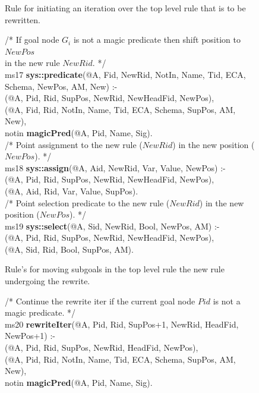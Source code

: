 \begin{appendix}
\begin{figure}[!t]
\begin{boxedminipage}{\linewidth}
\end{boxedminipage}
\caption{\label{ch:evita:fig:mpgoal} Rule for initiating an iteration over the
top level rule that is to be rewritten. }
\end{figure}


\begin{figure}[!t]
\ssp
\centering
\begin{boxedminipage}{\linewidth}
/* If goal node $G_i$ is not a magic predicate then shift position to $NewPos$  \\
   in the new rule $NewRid$. */ \\
ms17 {\bf sys::predicate}(@A, Fid, NewRid, NotIn, Name, Tid, ECA, Schema, NewPos, AM, New) :- \\
(@A, Pid, Rid, SupPos, NewRid, NewHeadFid, NewPos), \\
(@A, Fid, Rid, NotIn, Name, Tid, ECA, Schema, SupPos, AM, New), \\
\datalogspace notin {\bf magicPred}(@A, Pid, Name, Sig). \\
	
/* Point assignment to the new rule ($NewRid$) in the new position ($NewPos$). */ \\
ms18 {\bf sys::assign}(@A, Aid, NewRid, Var, Value, NewPos) :- \\
(@A, Pid, Rid, SupPos, NewRid, NewHeadFid, NewPos), \\
(@A, Aid, Rid, Var, Value, SupPos). \\
	
/* Point selection predicate to the new rule ($NewRid$) in the new position ($NewPos$). */ \\
ms19 {\bf sys::select}(@A, Sid, NewRid, Bool, NewPos, AM) :- \\
(@A, Pid, Rid, SupPos, NewRid, NewHeadFid, NewPos), \\
(@A, Sid, Rid, Bool, SupPos, AM).

\end{boxedminipage}
\caption{\label{ch:evita:fig:mpgoal} Rule's for moving subgoals in the top level rule
the new rule undergoing the rewrite. }
\end{figure}

\begin{figure}[!t]
\ssp
\centering
\begin{boxedminipage}{\linewidth}
/* Continue the rewrite iter if the current goal node $Pid$ is not a magic predicate. */ \\
ms20 {\bf rewriteIter}(@A, Pid, Rid, SupPos+1, NewRid, HeadFid, NewPos+1) :- \\
(@A, Pid, Rid, SupPos, NewRid, HeadFid, NewPos), \\
(@A, Pid, Rid, NotIn, Name, Tid, ECA, Schema, SupPos, AM, New), \\
\datalogspace notin {\bf magicPred}(@A, Pid, Name, Sig). \\


\end{boxedminipage}
\end{figure}
\end{appendix}
